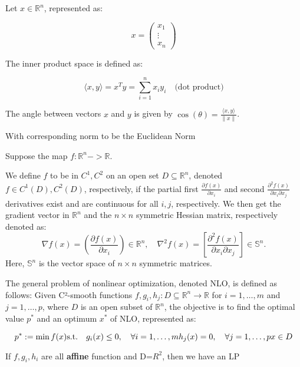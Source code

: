 \begin{definition}
    Let $x \in \mathbb{R}^n$, represented as:
    
    \[
    x = \begin{pmatrix}
        x_1 \\
        \vdots \\
        x_n
    \end{pmatrix}
    \]
    
    The inner product space is defined as:
    
    \[
    \langle x, y \rangle = x^T y = \sum_{i=1}^{n} x_i y_i \quad \text{(dot product)}
    \]

    The angle between vectors $x$ and $y$ is given by $\cos(\theta) = \frac{\langle x, y \rangle}{\|x\|}$.

    With corresponding norm to be the Euclidean Norm
\end{definition}



\begin{definition}[map]
    Suppose the map $f:\mathbb{R}^n -> \mathbb{R}$.
\end{definition}

\begin{definition}[differ]
    We define \(f\) to be in \(C^1, C^2\) on an open set \(D \subseteq \mathbb{R}^n\), denoted \(f \in C^1(D), C^2(D)\), respectively, if the partial first \(\frac{\partial f(x)}{\partial x_i}\) and second \(\frac{\partial^2 f(x)}{\partial x_i \partial x_j}\) derivatives exist and are continuous for all \(i, j\), respectively. We then get the gradient vector in \(\mathbb{R}^n\) and the \(n \times n\) symmetric Hessian matrix, respectively denoted as:
\[
\nabla f(x) = \left( \frac{\partial f(x)}{\partial x_i} \right) \in \mathbb{R}^n, \quad \nabla^2 f(x) = \left[ \frac{\partial^2 f(x)}{\partial x_i \partial x_j} \right] \in \mathbb{S}^n.
\]
Here, \(\mathbb{S}^n\) is the vector space of \(n \times n\) symmetric matrices.

\end{definition}


\begin{definition}
    The general problem of nonlinear optimization, denoted NLO, is defined as follows: Given C²-smooth functions
\(f, g_i, h_j : D \subseteq \mathbb{R}^n \rightarrow \mathbb{R}\) for \(i = 1, \ldots, m\) and \(j = 1, \ldots, p\), where \(D\) is an open subset of \(\mathbb{R}^n\), the objective is to find the optimal value \(p^*\) and an optimum \(x^*\) of NLO, represented as:

\[
p^* := \min f(x) \\
\text{s.t.} \quad g_i(x) \leq 0, \quad \forall i = 1, \ldots, m \\
h_j(x) = 0, \quad \forall j = 1, \ldots, p \\
x \in D
\]

If $f,g_i,h_i$ are all \textbf{affine} function and D=$R^2$, then we have an LP
\end{definition}

